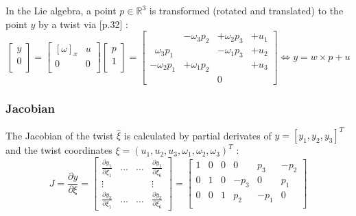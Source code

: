 \documentclass[12pt, a4paper]{article}
\begin{document}
In the Lie algebra, a point $p \in \mathbb{R}^3$ is transformed (rotated and translated) to the point $y$ by a twist via \cite{ma2005invitation}[p.32] :
\[
\begin{bmatrix}
 y\\
 0\\
\end{bmatrix}
=
\begin{bmatrix}
 [\omega]_x & u\\
 0 & 0\\
\end{bmatrix}
\begin{bmatrix}
 p\\
 1\\
\end{bmatrix}
=
\begin{bmatrix} 
   		   &  -\omega_3 p_2  & +\omega_2 p_3 	& + u_1\\ 
\;\;\omega_3 p_1 &                &  -\omega_1 p_3 	& + u_2 \\ 
-\omega_2 p_1 &	+\omega_1 p_2	   &     			& + u_3 \\ 
               & 			   & 0  &
\end{bmatrix}
\Leftrightarrow
y = w \times p + u
\]

\subsubsection{Jacobian}
The Jacobian of the twist $\hat\xi$ is calculated by partial derivates of $y=[y_1,y_2,y_3]^T$ and the twist coordinates $\xi = (u_1, u_2, u_3,\omega_1, \omega_2, \omega_3)^T$ \cite{slavcheva2015unified} :
\begin{equation}
J = \frac{\partial y}{\partial \xi} =
\begin{bmatrix} 
\frac{\partial{y_1}}{\partial{\xi_1}} & \dots & \dots & \frac{\partial{y_1}}{\partial{\xi_6}}	\\ 
\vdots 								 &      & & \vdots 							   		\\ 
\frac{\partial{y_3}}{\partial{\xi_1}} & \dots & \dots & \frac{\partial{y_3}}{\partial{\xi_6}}  
\end{bmatrix}
=
\begin{bmatrix}
1 & 0 & 0 &   0  & p_3  & -p_2 \\ 
0 & 1 & 0 & -p_3 &   0  &  p_1 \\ 
0 & 0 & 1 &  p_2 & -p_1 &  0   \\
\end{bmatrix} 
\label{eq:lieJacobian}
\end{equation}
\medskip


\end{document}
